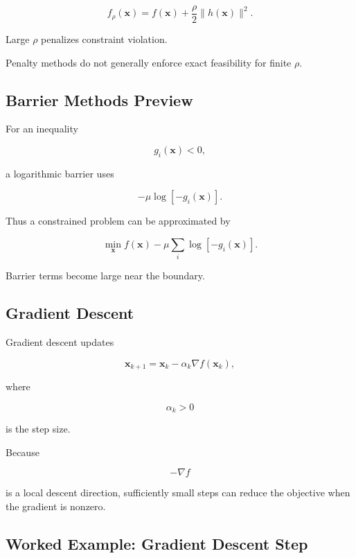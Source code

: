 \[
\boxed{
f_\rho(\mathbf{x})
=
f(\mathbf{x})
+
\frac{\rho}{2}
\|
h(\mathbf{x})
\|^2.
}
\]

Large \(\rho\) penalizes constraint violation.

Penalty methods do not generally enforce exact feasibility for finite
\(\rho\).

\subsection{Barrier Methods Preview}
\label{subsec:barrier-methods-preview}

For an inequality

\[
g_i(\mathbf{x})<0,
\]

a logarithmic barrier uses

\[
\boxed{
-\mu
\log
[
-g_i(\mathbf{x})
].
}
\]

Thus a constrained problem can be approximated by

\[
\boxed{
\min_{\mathbf{x}}
f(\mathbf{x})
-
\mu
\sum_i
\log
[
-g_i(\mathbf{x})
].
}
\]

Barrier terms become large near the boundary.

\subsection{Gradient Descent}
\label{subsec:gradient-descent}

Gradient descent updates

\[
\boxed{
\mathbf{x}_{k+1}
=
\mathbf{x}_k
-
\alpha_k
\nabla f(\mathbf{x}_k),
}
\]

where

\[
\alpha_k>0
\]

is the step size.

Because

\[
-\nabla f
\]

is a local descent direction, sufficiently small steps can reduce the
objective when the gradient is nonzero.

\subsection{Worked Example: Gradient Descent Step}
\label{subsec:worked-gradient-descent}

